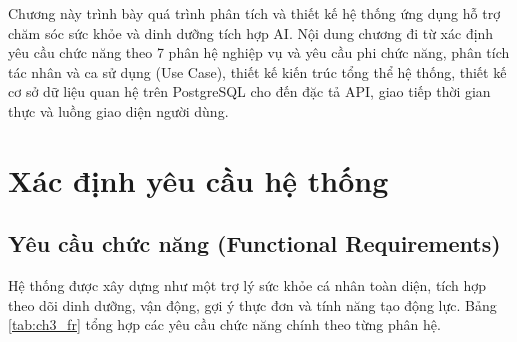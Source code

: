 \documentclass[../main.tex]{subfiles}
\begin{document}
Chương này trình bày quá trình phân tích và thiết kế hệ thống ứng dụng hỗ trợ chăm sóc sức khỏe và dinh dưỡng tích hợp AI. Nội dung chương đi từ xác định yêu cầu chức năng theo 7 phân hệ nghiệp vụ và yêu cầu phi chức năng, phân tích tác nhân và ca sử dụng (Use Case), thiết kế kiến trúc tổng thể hệ thống, thiết kế cơ sở dữ liệu quan hệ trên PostgreSQL cho đến đặc tả API, giao tiếp thời gian thực và luồng giao diện người dùng.

\section{Xác định yêu cầu hệ thống}
\label{sec:3.1}

\subsection{Yêu cầu chức năng (Functional Requirements)}

Hệ thống được xây dựng như một trợ lý sức khỏe cá nhân toàn diện, tích hợp theo dõi dinh dưỡng, vận động, gợi ý thực đơn và tính năng tạo động lực. Bảng \ref{tab:ch3_fr} tổng hợp các yêu cầu chức năng chính theo từng phân hệ.
\end{document}
